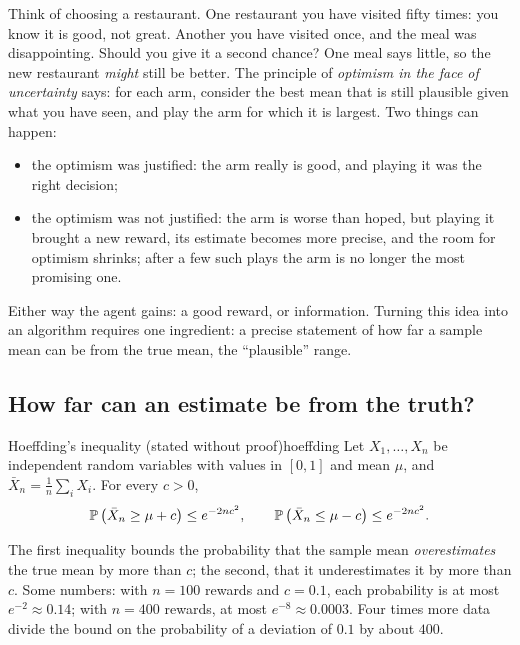 Think of choosing a restaurant. One restaurant you have visited fifty
times: you know it is good, not great. Another you have visited once, and
the meal was disappointing. Should you give it a second chance? One meal
says little, so the new restaurant \emph{might} still be better. The
principle of \emph{optimism in the face of uncertainty} says: for each arm,
consider the best mean that is still plausible given what you have seen,
and play the arm for which it is largest. Two things can happen:
\begin{itemize}[nosep]
  \item the optimism was justified: the arm really is good, and playing it
    was the right decision;
  \item the optimism was not justified: the arm is worse than hoped, but
    playing it brought a new reward, its estimate becomes more precise, and
    the room for optimism shrinks; after a few such plays the arm is no
    longer the most promising one.
\end{itemize}
Either way the agent gains: a good reward, or information. Turning this
idea into an algorithm requires one ingredient: a precise statement of how
far a sample mean can be from the true mean, the ``plausible'' range.

\subsection{How far can an estimate be from the truth?}

\begin{lemma}{Hoeffding's inequality (stated without proof)}{hoeffding}
  Let $X_1, \dots, X_n$ be independent random variables with values in
  $[0, 1]$ and mean $\mu$, and $\bar X_n = \frac{1}{n} \sum_i X_i$. For
  every $c > 0$,
  \begin{equation}
    \mathbb{P}\left(\bar X_n \geq \mu + c\right) \leq e^{-2 n c^2}, \qquad
    \mathbb{P}\left(\bar X_n \leq \mu - c\right) \leq e^{-2 n c^2}.
  \end{equation}
\end{lemma}

The first inequality bounds the probability that the sample mean
\emph{overestimates} the true mean by more than $c$; the second, that it
underestimates it by more than $c$. Some numbers: with $n = 100$ rewards
and $c = 0.1$, each probability is at most $e^{-2} \approx 0.14$; with $n =
400$ rewards, at most $e^{-8} \approx 0.0003$. Four times more data divide
the bound on the probability of a deviation of $0.1$ by about $400$.

